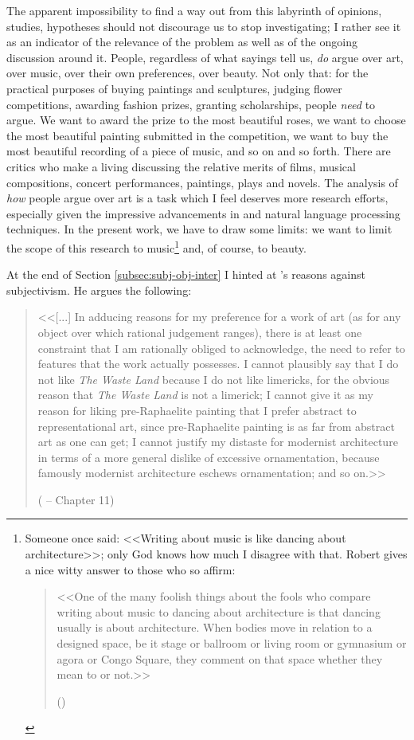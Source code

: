 The apparent impossibility to find a way out from this labyrinth of opinions, studies, hypotheses should not discourage us to stop investigating; I rather see it as an indicator of the relevance of the problem as well as of the ongoing discussion  around it. People, regardless of what sayings tell us, \emph{do} argue over art, over music, over their own preferences, over beauty. Not only that: for the practical purposes of buying paintings and sculptures, judging flower competitions, awarding fashion prizes, granting scholarships, people \emph{need} to argue. We want to award the prize to the most beautiful roses, we want to choose the most beautiful painting submitted in the competition, we want to buy the most beautiful recording of a piece of music, and so on and so forth. There are critics who make a
living discussing the relative merits of films, musical compositions, concert
performances, paintings, plays and novels. The analysis of \emph{how} people argue over art is a task which I feel deserves more research efforts, especially given the impressive advancements in  and natural language processing techniques. In the present work, we have to draw some limits: we want to limit the scope of this research to music\footnote{Someone once said: <<Writing about music is like dancing about architecture>>; only God knows how much I disagree with that. Robert \citeauthor{christgau2005writing} gives a nice witty answer to those who so affirm: 
\begin{quote}
<<One of the many foolish things about the fools who compare writing about music to dancing about architecture is that dancing usually is about architecture. When bodies move in relation to a designed space, be it stage or ballroom or living room or gymnasium or agora or Congo Square, they comment on that space whether they mean to or not.>>

(\cite{christgau2005writing})
\end{quote}} and, of course, to beauty.

At the end of Section \ref{subsec:subj-obj-inter} I hinted at \citeauthor{graham2005philosophy}'s reasons against subjectivism. He argues the following:
\begin{quote}
<<[...] In adducing reasons for my preference for a work of art (as for any object over which rational judgement ranges), there is at least one constraint that I am rationally obliged to acknowledge, the need to refer to features that the work actually possesses. I cannot plausibly say that I do not like \emph{The Waste Land} because I do not like limericks, for the obvious reason that \emph{The Waste Land} is not a limerick; I cannot give it as my reason for liking pre-Raphaelite painting that I prefer abstract to representational art, since pre-Raphaelite painting is as far from abstract art as one can get; I cannot justify my distaste for modernist architecture in terms of a more general dislike of excessive ornamentation, because famously modernist architecture eschews ornamentation; and so on.>>

(\cite{graham2005philosophy} -- Chapter 11)
\end{quote}

